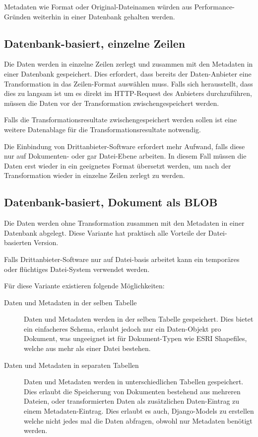 Metadaten wie Format oder Original-Dateinamen würden aus Performance-Gründen weiterhin in einer Datenbank gehalten werden.

\subsection{Datenbank-basiert, einzelne Zeilen}\label{sec:pd:datenbank-records}
Die Daten werden in einzelne Zeilen zerlegt und zusammen mit den Metadaten in einer Datenbank gespeichert. Dies erfordert, dass bereits der Daten-Anbieter eine Transformation in das Zeilen-Format auswählen muss. Falls sich herausstellt, dass dies zu langsam ist um es direkt im HTTP-Request des Anbieters durchzuführen, müssen die Daten vor der Transformation zwischengespeichert werden.

Falls die Transformationsresultate zwischengespeichert werden sollen ist eine weitere Datenablage für die Transformationsresultate notwendig.

Die Einbindung von Drittanbieter-Software erfordert mehr Aufwand, falls diese nur auf Dokumenten- oder gar Datei-Ebene arbeiten. In diesem Fall müssen die Daten erst wieder in ein geeignetes Format übersetzt werden, um nach der Transformation wieder in einzelne Zeilen zerlegt zu werden.

\subsection{Datenbank-basiert, Dokument als BLOB}
Die Daten werden ohne Transformation zusammen mit den Metadaten in einer Datenbank abgelegt. Diese Variante hat praktisch alle Vorteile der Datei-basierten Version.

Falls Drittanbieter-Software nur auf Datei-basis arbeitet kann ein temporäres oder flüchtiges Datei-System verwendet werden.

Für diese Variante existieren folgende Möglichkeiten:
\begin{description}
\item[Daten und Metadaten in der selben Tabelle] Daten und Metadaten werden in der selben Tabelle gespeichert. Dies bietet ein einfacheres Schema, erlaubt jedoch nur ein Daten-Objekt pro Dokument, was ungeeignet ist für Dokument-Typen wie ESRI Shapefiles, welche aus mehr als einer Datei bestehen.
\item[Daten und Metadaten in separaten Tabellen] Daten und Metadaten werden in unterschiedlichen Tabellen gespeichert. Dies erlaubt die Speicherung von Dokumenten bestehend aus mehreren Dateien, oder transformierten Daten als zusätzlichen Daten-Eintrag zu einem Metadaten-Eintrag. Dies erlaubt es auch, Django-Models zu erstellen welche nicht jedes mal die Daten abfragen, obwohl nur Metadaten benötigt werden.
\end{description}

